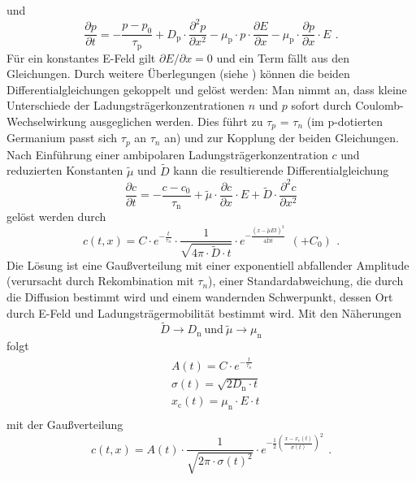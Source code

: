 und
\begin{equation}
\label{}
\frac{\partial p}{\partial t}=
-\frac{p-p_0}{\tau_{\text{p}}}
+ D_{\text{p}} \cdot \frac{\partial^2 p}{\partial x^2}
- \mu_{\text{p}} \cdot p \cdot \frac{\partial E}{\partial x}
- \mu_{\text{p}} \cdot \frac{\partial p}{\partial x} \cdot E \ \,.
\end{equation} 
Für ein konstantes E-Feld gilt $\partial E / \partial x = 0$ und ein Term fällt aus den Gleichungen.
Durch weitere Überlegungen (siehe \cite{staatsex}) können die beiden Differentialgleichungen
gekoppelt und gelöst werden:
Man nimmt an, dass kleine Unterschiede der Ladungsträgerkonzentrationen $n$ und $p$
sofort durch Coulomb-Wechselwirkung ausgeglichen werden. Dies führt zu $\tau_p$ = $\tau_n$
(im p-dotierten Germanium passt sich $\tau_p$ an $\tau_n$ an)
und zur Kopplung der beiden Gleichungen.\\
Nach Einführung einer ambipolaren Ladungsträgerkonzentration $c$ und reduzierten Konstanten
$\tilde{\mu}$ und $\tilde{D}$ kann die resultierende Differentialgleichung
\begin{equation}
\label{}
\frac{\partial c}{\partial t}=
-\frac{c-c_0}{\tau_{\text{n}}}
+ \tilde{\mu} \cdot \frac{\partial c}{\partial x} \cdot E
+ \tilde{D} \cdot \frac{\partial^2 c}{\partial x^2}
\end{equation}
gelöst werden durch
\begin{equation}
\label{}
c(t,x) = C \cdot e^{-\frac{t}{\tau_n}}
\cdot
\frac{1}{\sqrt{4  \pi  \cdot \tilde{D}  \cdot t}}
\cdot
e^{-\frac{(x - \tilde{\mu} E t)^2}{4 \tilde{D}  t}}
\ \ (+ C_0) \ \, .
\end{equation}
Die Lösung ist eine Gaußverteilung mit einer exponentiell abfallender Amplitude
(verursacht durch Rekombination mit $\tau_n$),
einer Standardabweichung, die durch die Diffusion bestimmt wird
und einem wandernden Schwerpunkt, dessen Ort durch E-Feld und Ladungsträgermobilität bestimmt wird.
Mit den Näherungen
\begin{equation}
\label{}
\tilde{D} \rightarrow D_{\text{n}} \ \text{und} \ \tilde{\mu} \rightarrow \mu_{\text{n}}
\end{equation}
folgt
\begin{equation}
\label{eq:gaus:params}
\begin{split}
& A(t) = C \cdot e^{-\frac{t}{\tau_n}}\\
& \sigma(t) = \sqrt{2 D_{\text{n}} \cdot t}\\
& x_{\text{c}}(t) = \mu_{\text{n}} \cdot E \cdot t\\
\end{split}
\end{equation}
mit der Gaußverteilung
\begin{equation}
\label{}
c(t,x) = A(t) \cdot \frac{1}{\sqrt{2 \pi \cdot \sigma(t)^2}} \cdot
e^{-\frac{1}{2} (\frac{x-x_{\text{c}}(t)}{\sigma(t)})^2} \ \, .
\end{equation}
